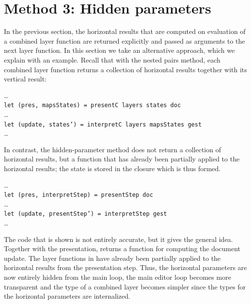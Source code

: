 \documentclass[preprint,natbib]{sigplanconf}
\begin{document}
%																
%																
%																
\section{Method 3: Hidden parameters} \label{sect:hidden}

 
In the previous section, the horizontal results that are computed on evaluation of a combined layer function are returned explicitly and passed as arguments to the next layer function. In this section we take an alternative approach, which we explain with an example.  Recall that with the nested pairs method, each combined layer function returns a collection of horizontal results together with its vertical result:

\dots\\
{\tt  let (pres, mapsStates) = presentC layers states doc }\\
\dots\\
{\tt let (update, states') = interpretC layers mapsStates gest}\\
\dots

In contrast, the hidden-parameter method does not return a collection of horizontal results, but a function that has already been partially applied to the horizontal results; the state is stored in the closure which is thus formed.

\dots\\
{\tt let (pres, interpretStep) = presentStep doc}\\
\dots\\
{\tt let (update, presentStep') = interpretStep gest}\\
\dots

The code that is shown is not entirely accurate, but it gives the general idea. Together with the presentation,  returns a function  for computing the document update. The layer functions in  have already been partially applied to the horizontal results from the presentation step. Thus, the horizontal parameters are now entirely hidden from the main loop, the main editor loop becomes more transparent and the type of a combined layer becomes simpler since the types for the horizontal parameters are internalized.


\end{document}
